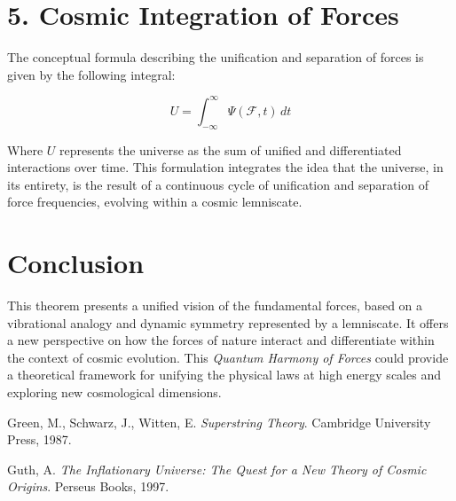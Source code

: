 \documentclass{article}
\begin{document}
\section{5. Cosmic Integration of Forces}

The conceptual formula describing the unification and separation of forces is given by the following integral:

\[
U = \int_{-\infty}^{\infty} \Psi(\mathcal{F}, t) \, dt
\]

Where \( U \) represents the universe as the sum of unified and differentiated interactions over time. This formulation integrates the idea that the universe, in its entirety, is the result of a continuous cycle of unification and separation of force frequencies, evolving within a cosmic lemniscate.

\section{Conclusion}

This theorem presents a unified vision of the fundamental forces, based on a vibrational analogy and dynamic symmetry represented by a lemniscate. It offers a new perspective on how the forces of nature interact and differentiate within the context of cosmic evolution. This \textit{Quantum Harmony of Forces} could provide a theoretical framework for unifying the physical laws at high energy scales and exploring new cosmological dimensions.

\begin{thebibliography}{9}

Green, M., Schwarz, J., Witten, E.
\textit{Superstring Theory}.
Cambridge University Press, 1987.

Guth, A.
\textit{The Inflationary Universe: The Quest for a New Theory of Cosmic Origins}.
Perseus Books, 1997.

\end{thebibliography}
\end{document}
